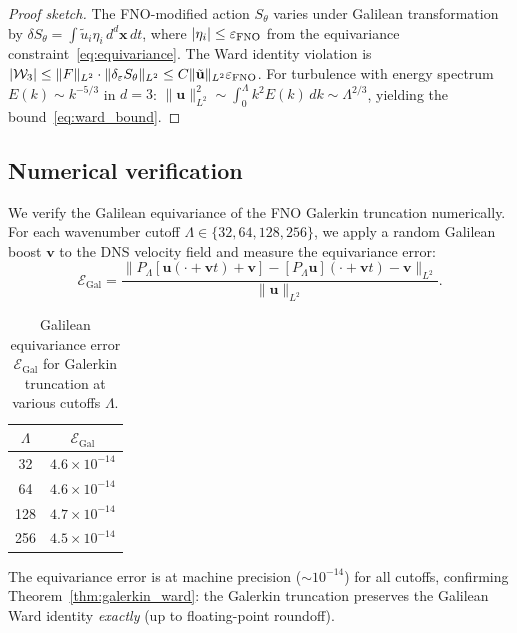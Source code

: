 \begin{proof}[Proof sketch]
The FNO-modified action $S_\theta$ varies under Galilean transformation by $\delta S_\theta = \int\tilde{u}_i\eta_i\,d^d\mathbf{x}\,dt$, where $|\eta_i|\leq\varepsilon_{\text{FNO}}$ from the equivariance constraint~\eqref{eq:equivariance}. The Ward identity violation is $|\mathcal{W}_3| \leq \|F\|_{L^2}\cdot\|\delta_\varepsilon S_\theta\|_{L^2} \leq C\|\tilde{\mathbf{u}}\|_{L^2}\varepsilon_{\text{FNO}}$. For turbulence with energy spectrum $E(k)\sim k^{-5/3}$ in $d=3$: $\|\mathbf{u}\|_{L^2}^2 \sim \int_0^\Lambda k^2 E(k)\,dk \sim \Lambda^{2/3}$, yielding the bound~\eqref{eq:ward_bound}.
\end{proof}

\subsection{Numerical verification\label{app:ward_numerical}}

We verify the Galilean equivariance of the FNO Galerkin truncation numerically. For each wavenumber cutoff $\Lambda \in \{32, 64, 128, 256\}$, we apply a random Galilean boost $\mathbf{v}$ to the DNS velocity field and measure the equivariance error:
\begin{equation}
\mathcal{E}_{\mathrm{Gal}} = \frac{\|P_\Lambda[\mathbf{u}(\cdot+\mathbf{v}t)+\mathbf{v}] - [P_\Lambda\mathbf{u}](\cdot+\mathbf{v}t) - \mathbf{v}\|_{L^2}}{\|\mathbf{u}\|_{L^2}}.
\end{equation}

\begin{table}[ht]
\centering \small
\caption{Galilean equivariance error $\mathcal{E}_{\mathrm{Gal}}$ for Galerkin truncation at various cutoffs $\Lambda$.}
\begin{ruledtabular}
\begin{tabular}{cc}
\hline\hline
$\Lambda$ & $\mathcal{E}_{\mathrm{Gal}}$ \\
\hline
32 & $4.6\times 10^{-14}$ \\
64 & $4.6\times 10^{-14}$ \\
128 & $4.7\times 10^{-14}$ \\
256 & $4.5\times 10^{-14}$ \\
\hline\hline
\end{tabular}
\end{ruledtabular}
\end{table}

The equivariance error is at machine precision ($\sim 10^{-14}$) for all cutoffs, confirming Theorem~\ref{thm:galerkin_ward}: the Galerkin truncation preserves the Galilean Ward identity \emph{exactly} (up to floating-point roundoff).

